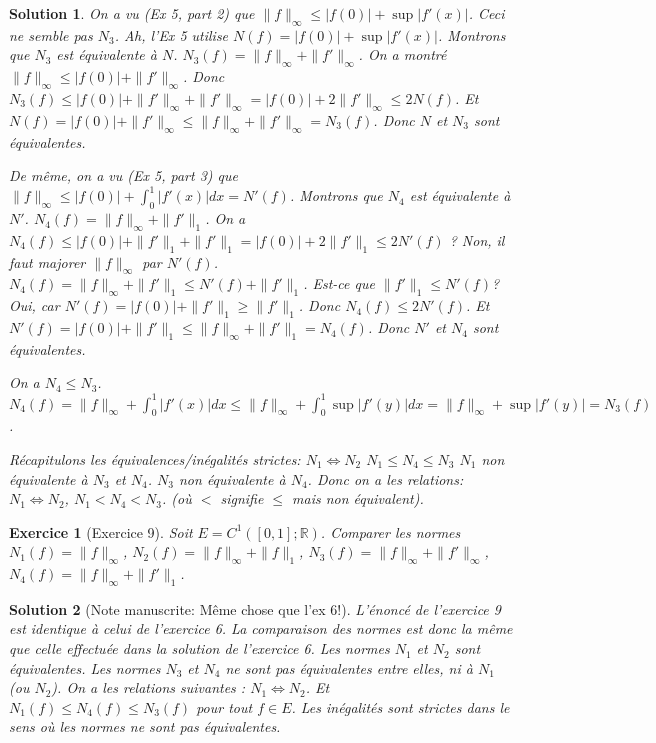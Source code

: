 \documentclass{article}
\newtheorem{solution}{Solution}
\newtheorem{exercise}{Exercice} %
\begin{document}
\begin{solution}
On a vu (Ex 5, part 2) que $\|f\|_\infty \leq |f(0)| + \sup|f'(x)|$. Ceci ne semble pas $N_3$.
Ah, l'Ex 5 utilise $N(f) = |f(0)| + \sup |f'(x)|$. Montrons que $N_3$ est équivalente à $N$.
$N_3(f) = \|f\|_\infty + \|f'\|_\infty$.
On a montré $\|f\|_\infty \leq |f(0)| + \|f'\|_\infty$. Donc $N_3(f) \leq |f(0)| + \|f'\|_\infty + \|f'\|_\infty = |f(0)| + 2 \|f'\|_\infty \leq 2 N(f)$.
Et $N(f) = |f(0)| + \|f'\|_\infty \leq \|f\|_\infty + \|f'\|_\infty = N_3(f)$.
Donc $N$ et $N_3$ sont équivalentes.

De même, on a vu (Ex 5, part 3) que $\|f\|_\infty \leq |f(0)| + \int_0^1 |f'(x)| dx = N'(f)$.
Montrons que $N_4$ est équivalente à $N'$.
$N_4(f) = \|f\|_\infty + \|f'\|_1$.
On a $N_4(f) \leq |f(0)| + \|f'\|_1 + \|f'\|_1 = |f(0)| + 2 \|f'\|_1 \leq 2 N'(f)$ ? Non, il faut majorer $\|f\|_\infty$ par $N'(f)$.
$N_4(f) = \|f\|_\infty + \|f'\|_1 \leq N'(f) + \|f'\|_1$. Est-ce que $\|f'\|_1 \leq N'(f)$? Oui, car $N'(f) = |f(0)| + \|f'\|_1 \geq \|f'\|_1$.
Donc $N_4(f) \leq 2 N'(f)$.
Et $N'(f) = |f(0)| + \|f'\|_1 \leq \|f\|_\infty + \|f'\|_1 = N_4(f)$.
Donc $N'$ et $N_4$ sont équivalentes.

On a $N_4 \leq N_3$.
$N_4(f) = \|f\|_\infty + \int_0^1 |f'(x)| dx \leq \|f\|_\infty + \int_0^1 \sup |f'(y)| dx = \|f\|_\infty + \sup |f'(y)| = N_3(f)$.

Récapitulons les équivalences/inégalités strictes:
$N_1 \iff N_2$
$N_1 \leq N_4 \leq N_3$
$N_1$ non équivalente à $N_3$ et $N_4$.
$N_3$ non équivalente à $N_4$.
Donc on a les relations: $N_1 \iff N_2$, $N_1 < N_4 < N_3$. (où $<$ signifie $\leq$ mais non équivalent).
\end{solution}

\begin{exercise}[Exercice 9]
Soit $E = C^1([0, 1]; \mathbb{R})$. Comparer les normes $N_1(f) = \|f\|_\infty$, $N_2(f) = \|f\|_\infty + \|f\|_1$, $N_3(f) = \|f\|_\infty + \|f'\|_\infty$, $N_4(f) = \|f\|_\infty + \|f'\|_1$.
\end{exercise}

\begin{solution}
[Note manuscrite: Même chose que l'ex 6!]
L'énoncé de l'exercice 9 est identique à celui de l'exercice 6. La comparaison des normes est donc la même que celle effectuée dans la solution de l'exercice 6.
Les normes $N_1$ et $N_2$ sont équivalentes.
Les normes $N_3$ et $N_4$ ne sont pas équivalentes entre elles, ni à $N_1$ (ou $N_2$).
On a les relations suivantes : $N_1 \iff N_2$. Et $N_1(f) \le N_4(f) \le N_3(f)$ pour tout $f \in E$. Les inégalités sont strictes dans le sens où les normes ne sont pas équivalentes.
\end{solution}
\end{document}
